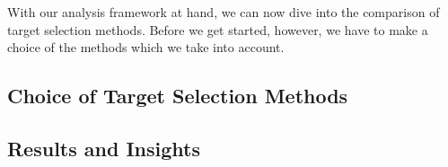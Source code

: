With our analysis framework at hand, we can now dive into the comparison of target selection methods.
Before we get started, however, we have to make a choice of the methods which we take into account.

\subsection{Choice of Target Selection Methods}
\label{sec:target-selection-methods}


\subsection{Results and Insights}

